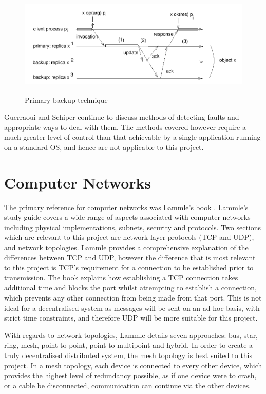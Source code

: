 \documentclass[a4paper, 11pt]{report}
\begin{document}
\begin{figure}[H]
\centering
\includegraphics[height=5cm,keepaspectratio]{primback}
\caption{Primary backup technique \cite{faulttol}} 
\label{fig:backup}
\end{figure}

Guerraoui and Schiper continue to discuss methods of detecting faults and appropriate ways to deal with them. The methods covered however require a much greater level of control than that achievable by a single application running on a standard \acrshort{OS}, and hence are not applicable to this project.

\section{Computer Networks}
The primary reference for computer networks was Lammle's book  \cite{comptiaNet}. Lammle's study guide covers a wide range of aspects associated with computer networks including physical implementations, subnets, security and protocols. Two sections which are relevant to this project are network layer protocols (\acrshort{TCP} and \acrshort{UDP}), and network topologies. Lammle provides a comprehensive explanation of the differences between \acrfull{TCP} and \acrfull{UDP}, however the difference that is most relevant to this project is \acrshort{TCP}'s requirement for a connection to be established prior to transmission. The book explains how establishing a \acrshort{TCP} connection takes additional time and blocks the port whilst attempting to establish a connection, which prevents any other connection from being made from that port. This is not ideal for a decentralised system as messages will be sent on an ad-hoc basis, with strict time constraints, and therefore \acrshort{UDP} will be more suitable for this project.

With regards to network topologies, Lammle details seven approaches: bus, star, ring, mesh, point-to-point, point-to-multipoint and hybrid. In order to create a truly decentralised distributed system, the mesh topology is best suited to this project. In a mesh topology, each device is connected to every other device, which provides the highest level of redundancy possible, as if one device were to crash, or a cable be disconnected, communication can continue via the other devices.
\end{document}
